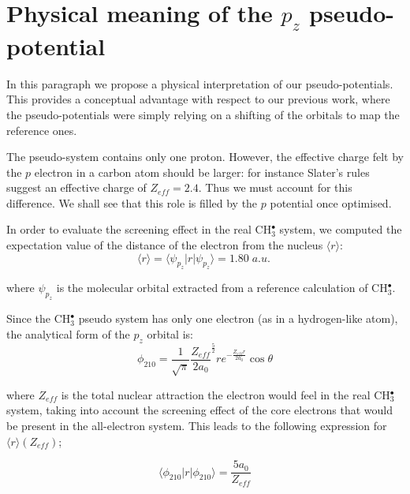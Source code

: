 \documentclass[12pt]{article}
\begin{document}
\section*{\sffamily \large Physical meaning of the \(p_{z}\) pseudo-potential} \label{minimalpotguess}

In this paragraph we propose a physical interpretation of our pseudo-potentials. This
provides a conceptual advantage with respect to our previous work,\cite{drujon_pseudopotentials_2013} 
where the pseudo-potentials were simply relying on a shifting of the orbitals to map the reference ones.

The pseudo-system contains only one proton. However, the effective charge felt by the $p$ electron in a carbon atom should be larger: for instance Slater's rules suggest an effective charge of $Z_{eff}=2.4$. Thus we must account for this difference. We shall see that this role is filled by the $p$ potential once optimised. 

In order to evaluate the screening effect in the real CH\(^{\bullet}_{3}\) system, we computed the expectation value of the distance of the electron from the nucleus \( \langle r \rangle \):
\begin{equation}
\langle r \rangle = \langle \psi_{p_{z}} | r | \psi_{p_{z}} \rangle = 1.80\;a.u.\
\label{equation:exp_r}
\end{equation}

where \(\psi_{p_{z}}\) is the molecular orbital extracted from a reference calculation of CH\(^{\bullet}_{3}\). 

Since the CH\(^{\bullet}_{3}\) pseudo system has only one electron (as in a hydrogen-like atom), 
the analytical form of the \(p_{z}\) orbital is:~\cite{me_structure_theory} 
\begin{equation}
\label{equation:analyticalpz}
\phi_{210} = \frac{1}{\sqrt{\pi}} \frac{Z_{eff}}{2a_{0}} ^{\frac{5}{2}} re^{-\frac{Z_{eff}r}{2a_{0}}} \cos \theta
\end{equation}

where \(Z_{eff}\) is the total nuclear attraction the electron 
would feel in the real CH\(^{\bullet}_{3}\) system, taking into account the screening effect of the core electrons that would be 
present in the all-electron system.
This leads to the following expression for \( \langle r \rangle (Z_{eff}) \); 

\begin{equation}
\label{equation:PsirPsi}
\langle \phi_{210} | r | \phi_{210} \rangle = \frac{5a_{0}}{Z_{eff}}
\end{equation}
\end{document}

